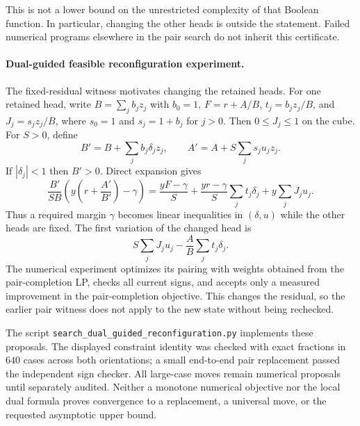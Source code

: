 \documentclass[11pt]{article}
\begin{document}
This is not a lower bound on the unrestricted complexity of that
Boolean function. In particular, changing the other heads is outside
the statement. Failed numerical programs elsewhere in the pair
search do not inherit this certificate.


\paragraph{Dual-guided feasible reconfiguration experiment.}
The fixed-residual witness motivates changing the retained heads.
For one retained head, write $B=\sum_j b_jz_j$ with $b_0=1$,
$F=r+A/B$, $t_j=b_jz_j/B$, and
$J_j=s_jz_j/B$, where $s_0=1$ and $s_j=1+b_j$ for $j>0$.
Then $0\le J_j\le1$ on the cube. For $S>0$, define
\[
 B'=B+\sum_jb_j\delta_jz_j,\qquad
 A'=A+S\sum_js_ju_jz_j.
\]
If $|\delta_j|<1$ then $B'>0$. Direct expansion gives
\[
 \frac{B'}{SB}\left(y\left(r+\frac{A'}{B'}\right)-\gamma\right)
 =\frac{yF-\gamma}{S}
  +\frac{yr-\gamma}{S}\sum_jt_j\delta_j
  +y\sum_jJ_ju_j.
\]
Thus a required margin $\gamma$ becomes linear inequalities in
$(\delta,u)$ while the other heads are fixed. The first variation
of the changed head is
\[
 S\sum_jJ_ju_j-\frac{A}{B}\sum_jt_j\delta_j.
\]
The numerical experiment optimizes its pairing with weights obtained
from the pair-completion LP, checks all current signs, and accepts
only a measured improvement in the pair-completion objective.
This changes the residual, so the earlier pair witness does not
apply to the new state without being rechecked.

The script \texttt{search\_dual\_guided\_reconfiguration.py} implements
these proposals. The displayed constraint identity was checked with
exact fractions in $640$ cases across both orientations; a small
end-to-end pair replacement passed the independent sign checker.
All large-case moves remain numerical proposals until separately
audited. Neither a monotone numerical objective nor the local dual
formula proves convergence to a replacement, a universal move,
or the requested asymptotic upper bound.
\end{document}
